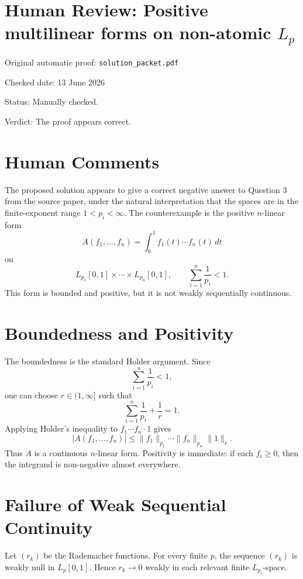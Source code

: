 \documentclass[11pt]{article}
\begin{document}
\section*{Human Review: Positive multilinear forms on non-atomic \texorpdfstring{$L_p$}{Lp}}

\noindent Original automatic proof: \texttt{solution\_packet.pdf}

\noindent Checked date: 13 June 2026

\noindent Status: Manually checked.

\noindent Verdict: The proof appears correct.

\section*{Human Comments}

The proposed solution appears to give a correct negative answer to Question 3
from the source paper, under the natural interpretation that the spaces are in
the finite-exponent range \(1<p_i<\infty\). The counterexample is the positive
\(n\)-linear form
\[
  A(f_1,\ldots,f_n)=\int_0^1 f_1(t)\cdots f_n(t)\,dt
\]
on
\[
  L_{p_1}[0,1]\times\cdots\times L_{p_n}[0,1],
  \qquad
  \sum_{i=1}^n \frac1{p_i}<1.
\]
This form is bounded and positive, but it is not weakly sequentially
continuous.

\section*{Boundedness and Positivity}

The boundedness is the standard Holder argument. Since
\[
  \sum_{i=1}^n \frac1{p_i}<1,
\]
one can choose \(r\in(1,\infty]\) such that
\[
  \sum_{i=1}^n \frac1{p_i}+\frac1r=1.
\]
Applying Holder's inequality to \(f_1\cdots f_n\cdot 1\) gives
\[
  |A(f_1,\ldots,f_n)|
  \leq
  \|f_1\|_{p_1}\cdots \|f_n\|_{p_n}\|1\|_r.
\]
Thus \(A\) is a continuous \(n\)-linear form. Positivity is immediate: if
each \(f_i\geq0\), then the integrand is non-negative almost everywhere.

\section*{Failure of Weak Sequential Continuity}

Let \((r_k)\) be the Rademacher functions. For every finite \(p\), the
sequence \((r_k)\) is weakly null in \(L_p[0,1]\). Hence \(r_k\to0\) weakly in
each relevant finite \(L_{p_i}\)-space.
\end{document}
